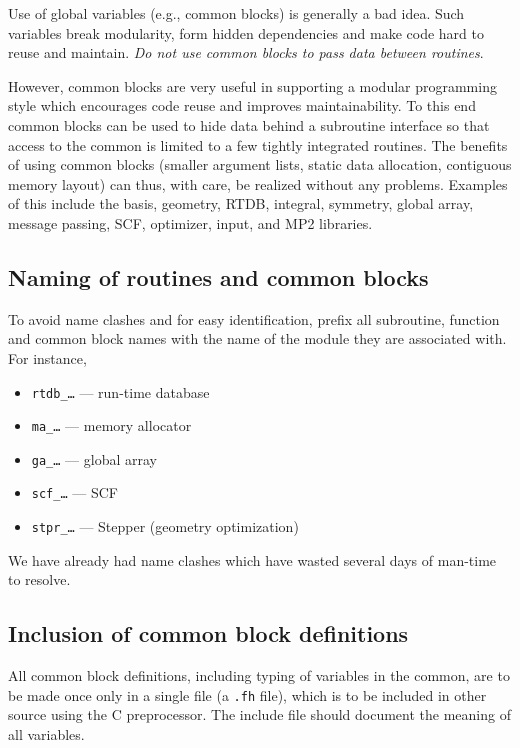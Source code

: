 Use of global variables (e.g., common blocks) is generally a bad idea.
Such variables break modularity, form hidden dependencies and make
code hard to reuse and maintain.  {\em Do not use common blocks to
  pass data between routines}.

However, common blocks are very useful in supporting a modular
programming style which encourages code reuse and improves
maintainability.  To this end common blocks can be used to hide data
behind a subroutine interface so that access to the common is limited
to a few tightly integrated routines.  The benefits of using common
blocks (smaller argument lists, static data allocation, contiguous
memory layout) can thus, with care, be realized without any problems.
Examples of this include the basis, geometry, RTDB, integral,
symmetry, global array, message passing, SCF, optimizer, input, and
MP2 libraries.

\subsection{Naming of routines and common blocks}

To avoid name clashes and for easy identification, prefix all
subroutine, function and common block names with the name of the
module they are associated with.  For instance,
\begin{itemize}
\item {\tt rtdb\_\ldots} --- run-time database
\item {\tt ma\_\ldots} --- memory allocator
\item {\tt ga\_\ldots} --- global array
\item {\tt scf\_\ldots} --- SCF
\item {\tt stpr\_\ldots} --- Stepper (geometry optimization)
\end{itemize}

We have already had name clashes which have wasted several days of
man-time to resolve.

\subsection{Inclusion of common block definitions}

All common block definitions, including typing of variables in the
common, are to be made once only in a single file (a {\tt.fh} file),
which is to be included in other source using the C preprocessor.  The
include file should document the meaning of all variables.  

